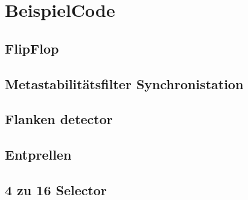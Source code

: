 \section{BeispielCode}
\subsection{FlipFlop}
%
\subsection{Metastabilitätsfilter Synchronistation}
%
\subsection{Flanken detector}
%
\subsection{Entprellen}
%
\subsection{4 zu 16 Selector}
%

